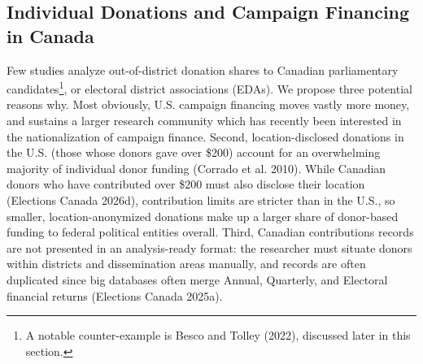 \documentclass[
  letterpaper,
  DIV=11,
  numbers=noendperiod]{scrartcl}
\begin{document}
\subsection{Individual Donations and Campaign Financing in
Canada}\label{sec-lit-review}

Few studies analyze out-of-district donation shares to Canadian
parliamentary candidates\footnote{A notable counter-example is Besco and
  Tolley (2022), discussed later in this section.}, or electoral
district associations (EDAs). We propose three potential reasons why.
Most obviously, U.S. campaign financing moves vastly more money, and
sustains a larger research community which has recently been interested
in the nationalization of campaign finance. Second, location-disclosed
donations in the U.S. (those whose donors gave over \$200) account for
an overwhelming majority of individual donor funding (Corrado et al.
2010). While Canadian donors who have contributed over \$200 must also
disclose their location (Elections Canada 2026d), contribution limits
are stricter than in the U.S., so smaller, location-anonymized donations
make up a larger share of donor-based funding to federal political
entities overall. Third, Canadian contributions records are not
presented in an analysis-ready format: the researcher must situate
donors within districts and dissemination areas manually, and records
are often duplicated since big databases often merge Annual, Quarterly,
and Electoral financial returns (Elections Canada 2025a).
\end{document}
